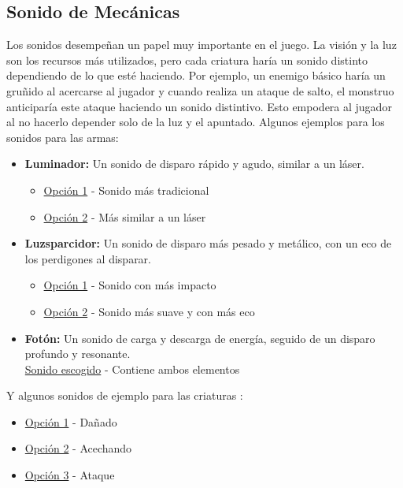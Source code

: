     \subsection{Sonido de Mecánicas}
        Los sonidos desempeñan un papel muy importante en el juego. La visión y la luz son los recursos más utilizados, pero cada criatura haría un sonido distinto dependiendo de lo que esté haciendo. Por ejemplo, un enemigo básico haría un gruñido al acercarse al jugador y cuando realiza un ataque de salto, el monstruo anticiparía este ataque haciendo un sonido distintivo. Esto empodera al jugador al no hacerlo depender solo de la luz y el apuntado.
        Algunos ejemplos para los sonidos para las armas:
        \begin{itemize}
            \item \textbf{Luminador:} Un sonido de disparo rápido y agudo, similar a un láser.
            \begin{itemize}
                \item \href{https://drive.google.com/open?id=1--GmmPExYlCoyFkUiGgEEhoB6ZvPko4W&usp=drive_fs}{Opción 1} - Sonido más tradicional
                \item \href{https://drive.google.com/open?id=1-8QOVx0icIXQ2tiE5wcexUUpAmHtnrhO&usp=drive_fs}{Opción 2} - Más similar a un láser
            \end{itemize}
            \item \textbf{Luzsparcidor:} Un sonido de disparo más pesado y metálico, con un eco de los perdigones al disparar.
            \begin{itemize}
                \item \href{https://drive.google.com/open?id=1ePwIRZERfeH8iIn4U1qDEDvSef1qM3Ja&usp=drive_fs}{Opción 1} - Sonido con más impacto
                \item \href{https://drive.google.com/open?id=1d05kAcgOKx4CygJESJ_SjWyzid2VOUDn&usp=drive_fs}{Opción 2} - Sonido más suave y con más eco
            \end{itemize}
            \item \textbf{Fotón:} Un sonido de carga y descarga de energía, seguido de un disparo profundo y resonante.\\
                \href{https://drive.google.com/open?id=1-6RLC8SU9PWc3WL4-Esuh9aY8DqgYpkp&usp=drive_fs}{Sonido escogido} - Contiene ambos elementos
        \end{itemize}

        Y algunos sonidos de ejemplo para las criaturas \fodder:
        \begin{itemize}
            \item \href{https://drive.google.com/open?id=1-Q6D-lYbQ08UV0V2YRYh_UzvoASzTDrT&usp=drive_fs}{Opción 1} - Dañado
            \item \href{https://drive.google.com/open?id=1-RnyeL0Zham_IY5yZCOLxoxnW-wHrhX1&usp=drive_fs}{Opción 2} - Acechando
            \item \href{https://drive.google.com/open?id=1-SIBq_0QMMFYzFxj3VXAsfGzK31PZcJF&usp=drive_fs}{Opción 3} - Ataque
        \end{itemize}
\newpage

